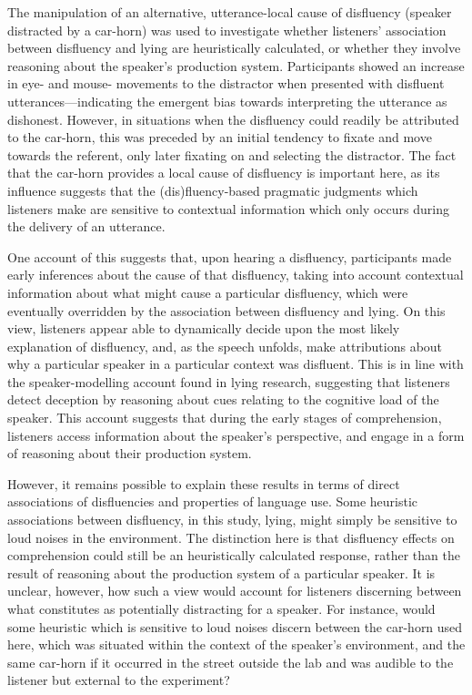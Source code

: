 \documentclass[a4paper,man,natbib]{apa6}
\begin{document}
The manipulation of an alternative, utterance-local cause of disfluency (speaker distracted by a car-horn) was used to investigate whether listeners' association between disfluency and lying are heuristically calculated, or whether they involve reasoning about the speaker's production system. 
Participants showed an increase in eye- and mouse- movements to the distractor when presented with disfluent utterances---indicating the emergent bias towards interpreting the utterance as dishonest. 
However, in situations when the disfluency could readily be attributed to the car-horn, this was preceded by an initial tendency to fixate and move towards the referent, only later fixating on and selecting the distractor. 
The fact that the car-horn provides a local cause of disfluency is important here, as its influence suggests that the (dis)fluency-based pragmatic judgments which listeners make are sensitive to contextual information which only occurs during the delivery of an utterance. 

One account of this suggests that, upon hearing a disfluency, participants made early inferences about the cause of that disfluency, taking into account contextual information about what might cause a particular disfluency, which were eventually overridden by the association between disfluency and lying.
On this view, listeners appear able to dynamically decide upon the most likely explanation of disfluency, and, as the speech unfolds, make attributions about why a particular speaker in a particular context was disfluent. 
This is in line with the speaker-modelling account found in lying research, suggesting that listeners detect deception by reasoning about cues relating to the cognitive load of the speaker\citep{Zuckerman1981,depaulo2003cues}.
This account suggests that during the early stages of comprehension, listeners access information about the speaker's perspective, and engage in a form of reasoning about their production system. 


However, it remains possible to explain these results in terms of direct associations of disfluencies and properties of language use. 
Some heuristic associations between disfluency, in this study, lying, might simply be sensitive to loud noises in the environment.
The distinction here is that disfluency effects on comprehension could still be an heuristically calculated response, rather than the result of reasoning about the production system of a particular speaker.
It is unclear, however, how such a view would account for listeners discerning between what constitutes as potentially distracting for a speaker. 
For instance, would some heuristic which is sensitive to loud noises discern between the car-horn used here, which was situated within the context of the speaker's environment, and the same car-horn if it occurred in the street outside the lab and was audible to the listener but external to the experiment? 
\end{document}
